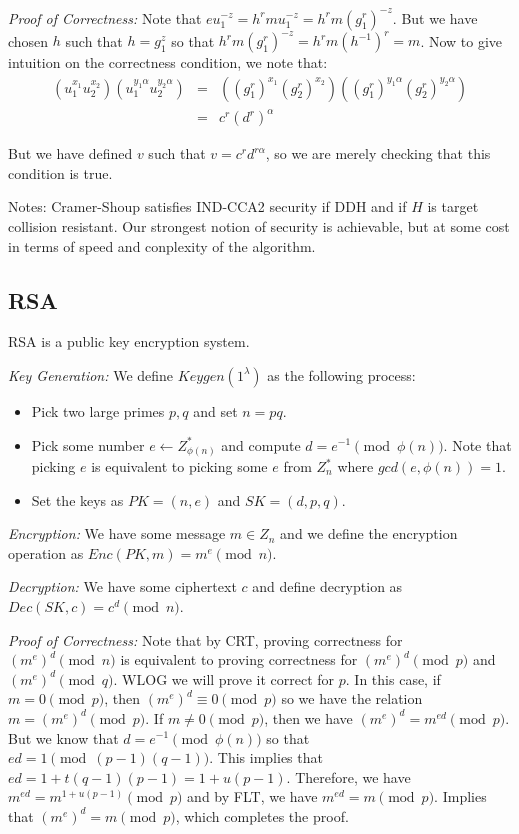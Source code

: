 \documentclass[psamsfonts]{amsart}
\begin{document}
\emph{Proof of Correctness:} Note that $e u_1^{-z} = h^r m u_1^{-z} = h^r m (g_1^{r})^{-z}$. But we have chosen $h$ such that $h = g_1^z$ so that $h^r m (g_1^{r})^{-z} = h^r m (h^{-1})^r = m$. Now to give intuition on the correctness condition, we note that:
\begin{eqnarray}
  (u_1^{x_1} u_2^{x_2})(u_1^{y_1 \alpha} u_2^{y_2 \alpha}) &=& ((g_1^{r})^{x_1}(g_2^{r})^{x_2})((g_1^{r})^{y_1 \alpha} (g_2^{r})^{y_2 \alpha}) \\
                                                           &=& c^r (d^r)^\alpha
\end{eqnarray}

But we have defined $v$ such that $v = c^r d^{r \alpha}$, so we are merely checking that this condition is true.

Notes: Cramer-Shoup satisfies IND-CCA2 security if DDH and if $H$ is target collision resistant. Our strongest notion of security is achievable, but at some cost in terms of speed and conplexity of the algorithm.

\subsection{RSA}

RSA is a public key encryption system.

\emph{Key Generation:} We define $Keygen(1^\lambda)$ as the following process:
\begin{itemize}
  \item Pick two large primes $p,q$ and set $n = pq$.
  \item Pick some number $e \leftarrow Z_{\phi(n)}^*$ and compute $d = e^{-1} \pmod{\phi(n)}$. Note that picking $e$ is equivalent to picking some $e$ from $Z_n^*$ where $gcd(e, \phi(n)) = 1$.
  \item Set the keys as $PK = (n, e)$ and $SK = (d, p, q)$.
\end{itemize}

\emph{Encryption:} We have some message $m \in Z_n$ and we define the encryption operation as $Enc(PK, m) = m^e \pmod{n}$.

\emph{Decryption:} We have some ciphertext $c$ and define decryption as $Dec(SK, c) = c^d \pmod{n}$.

\emph{Proof of Correctness:} Note that by CRT, proving correctness for $(m^e)^d \pmod{n}$ is equivalent to proving correctness for $(m^e)^d \pmod{p}$ and $(m^e)^d \pmod{q}$. WLOG we will prove it correct for $p$. In this case, if $m = 0 \pmod{p}$, then $(m^e)^d \equiv 0 \pmod{p}$ so we have the relation $m = (m^e)^d \pmod{p}$. If $m \neq 0 \pmod{p}$, then we have $(m^e)^d = m^{ed} \pmod{p}$. But we know that $d = e^{-1} \pmod{\phi(n)}$ so that $ed = 1 \pmod{(p-1)(q-1)}$. This implies that $ed = 1 + t(q-1)(p-1) = 1 + u(p-1)$. Therefore, we have $m^{ed} = m^{1+u(p-1)} \pmod{p}$ and by FLT, we have $m^{ed} = m \pmod{p}$. Implies that $(m^e)^d = m \pmod{p}$, which completes the proof.
\end{document}
